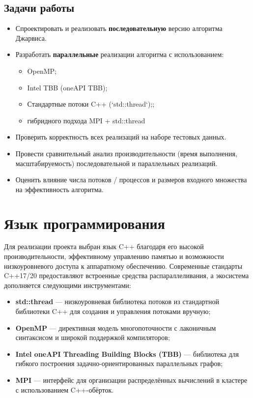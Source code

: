\documentclass[12pt,a4paper]{article}
\begin{document}
\subsection*{Задачи работы}
\begin{itemize}
    \item Спроектировать и реализовать \textbf{последовательную} версию алгоритма Джарвиса.
    \item Разработать \textbf{параллельные} реализации алгоритма с использованием:
    \begin{itemize}
        \item OpenMP;
        \item Intel TBB (oneAPI TBB);
        \item Стандартные потоки C++ (`std::thread`);;
        \item гибридного подхода MPI + std::thread
    \end{itemize}
    \item Проверить корректность всех реализаций на наборе тестовых данных.
    \item Провести сравнительный анализ производительности (время выполнения, масштабируемость) последовательной и параллельных реализаций.
    \item Оценить влияние числа потоков / процессов и размеров входного множества на эффективность алгоритма.
\end{itemize}

\section{Язык программирования}

Для реализации проекта выбран язык C++ благодаря его высокой производительности, эффективному управлению памятью и возможности низкоуровневого доступа к аппаратному обеспечению. Современные стандарты C++17/20 предоставляют встроенные средства распараллеливания, а экосистема дополняется следующими инструментами:

\begin{itemize}
  \item \textbf{std::thread} — низкоуровневая библиотека потоков из стандартной библиотеки C++ для создания и управления потоками вручную;
  \item \textbf{OpenMP} — директивная модель многопоточности с лаконичным синтаксисом и широкой поддержкой компиляторов;
  \item \textbf{Intel oneAPI Threading Building Blocks (TBB)} — библиотека для гибкого построения задачно-ориентированных параллельных графов;
  \item \textbf{MPI} — интерфейс для организации распределённых вычислений в кластере с использованием C++-обёрток.
\end{itemize}
\end{document}
